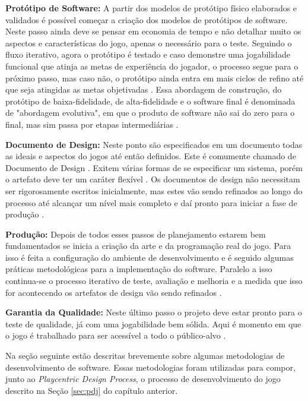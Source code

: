 \begin{enumerate}
    {\color{textmodified}
    \item \textbf{Protótipo de Software:} A partir dos modelos de protótipo físico elaborados e validados é possível começar a criação dos modelos de protótipos de software. Neste passo ainda deve se pensar em economia de tempo e não detalhar muito os aspectos e características do jogo, apenas o necessário para o teste. Seguindo o fluxo iterativo, agora o protótipo é testado e caso demonstre uma jogabilidade funcional que atinja as metas de experiência do jogador, o processo segue para o próximo passo, mas caso não, o protótipo ainda entra em mais ciclos de refino até que seja atingidas as metas objetivadas \cite[p. 15]{Fullerton_2008}. Essa abordagem de construção, do protótipo de baixa-fidelidade, de alta-fidelidade e o software final é denominada de "abordagem evolutiva", em que o produto de software não sai do zero para o final, mas sim passa por etapas intermediárias \cite[p. 268]{Preece_Rogers_Sharp_2005}. %
    }
    
    \item \textbf{Documento de Design:} Neste ponto são especificados em um documento todas as ideais e aspectos do jogos até então definidos. Este é comumente chamado de Documento de Design \cite[p. 15]{Fullerton_2008}. Exitem várias formas de se especificar um sistema, porém o artefato deve ter um caráter flexível  \cite[p. 129]{Pressman_2000}. Os documentos de design não necessitam ser rigorosamente escritos inicialmente, mas estes vão sendo refinados ao longo do processo até alcançar um nível mais completo e daí pronto para iniciar a fase de produção \cite[p. 15]{Fullerton_2008}. %

    \item \textbf{Produção:} Depois de todos esses passos de planejamento estarem bem fundamentados se inicia a criação da arte e da programação real do jogo. Para isso é feita a configuração do ambiente de desenvolvimento e é seguido algumas práticas metodológicas para a implementação do software. Paralelo a isso continua-se o processo iterativo de teste, avaliação e melhoria e a medida que isso for acontecendo os artefatos de design vão sendo refinados \cite[p. 41]{Pressman_2000} \cite[p. 15, 18]{Fullerton_2008}. 
    
    \item \textbf{Garantia da Qualidade:} Neste último passo o projeto deve estar pronto para o teste de qualidade, já com uma jogabilidade bem sólida. Aqui é momento em que o jogo é trabalhado para ser acessível a todo o público-alvo \cite[p. 18]{Fullerton_2008}. %
    
\end{enumerate}
\newpage
Na seção seguinte estão descritas brevemente sobre algumas metodologias de desenvolvimento de software. Essas metodologias foram utilizadas para compor, junto ao \textit{Playcentric Design Process}, o processo de desenvolvimento do jogo descrito na Seção \ref{sec:pdj} do capítulo anterior.

